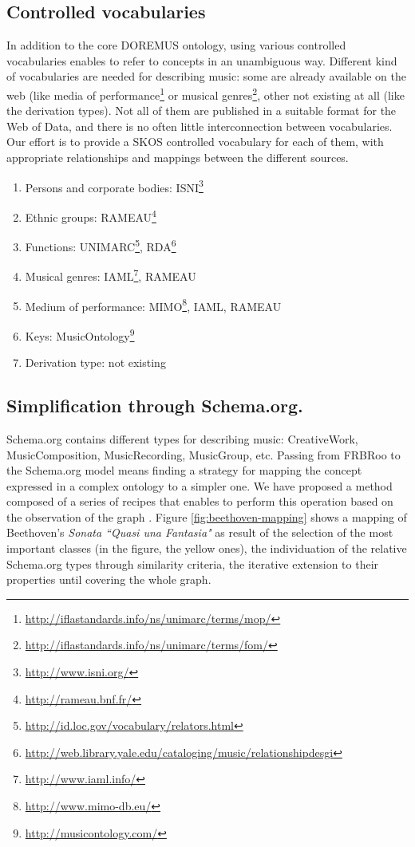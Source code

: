 \documentclass{llncs}
\begin{document}
\subsection{Controlled vocabularies}
In addition to the core DOREMUS ontology, using various controlled vocabularies enables to refer to concepts in an unambiguous way. Different kind of vocabularies are needed for describing music: some are already available on the web (like media of performance\footnote{\url{http://iflastandards.info/ns/unimarc/terms/mop/}} or musical genres\footnote{\url{http://iflastandards.info/ns/unimarc/terms/fom/}}, other not existing at all (like the derivation types).
Not all of them are published in a suitable format for the Web of Data, and there is no often little interconnection between vocabularies. Our effort is to provide a SKOS controlled vocabulary for each of them, with appropriate relationships and mappings between the different sources.
\begin{enumerate}
\item{Persons and corporate bodies: ISNI\footnote{\url{http://www.isni.org/}}}
\item{Ethnic groups: RAMEAU\footnote{\url{http://rameau.bnf.fr/}}}
\item{Functions: UNIMARC\footnote{\url{http://id.loc.gov/vocabulary/relators.html}}, RDA\footnote{\url{http://web.library.yale.edu/cataloging/music/relationshipdesgi}}}
\item{Musical genres: IAML\footnote{\url{http://www.iaml.info/}}, RAMEAU}
\item{Medium of performance: MIMO\footnote{\url{http://www.mimo-db.eu/}}, IAML, RAMEAU}
\item{Keys: MusicOntology\footnote{\url{http://musicontology.com/}}}
\item{Derivation type: not existing}
\end{enumerate}

\subsection{Simplification through Schema.org.}

Schema.org contains different types for describing music: CreativeWork, MusicComposition, MusicRecording, MusicGroup, etc. Passing from FRBRoo to the Schema.org model means finding a strategy for mapping the concept expressed in a complex ontology to a simpler one. We have proposed a method composed of a series of recipes that enables to perform this operation based on the observation of the graph \cite{lisena2016mapping}. Figure \ref{fig:beethoven-mapping} shows a mapping of Beethoven's \textit{Sonata ``Quasi una Fantasia"} as result of the selection of the most important classes (in the figure, the yellow ones), the individuation of the relative Schema.org types through similarity criteria, the iterative extension to their properties until covering the whole graph. 
\end{document}
